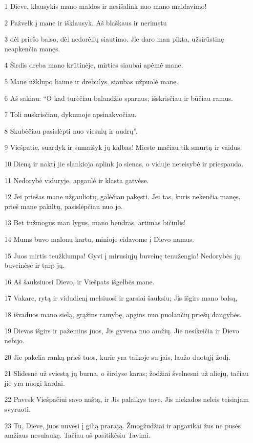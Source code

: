\par 1 Dieve, klausykis mano maldos ir nesišalink nuo mano maldavimo! 
\par 2 Pažvelk į mane ir išklausyk. Aš blaškaus ir nerimstu 
\par 3 dėl priešo balso, dėl nedorėlių siautimo. Jie daro man pikta, užsirūstinę neapkenčia manęs. 
\par 4 Širdis dreba mano krūtinėje, mirties siaubai apėmė mane. 
\par 5 Mane užklupo baimė ir drebulys, siaubas užpuolė mane. 
\par 6 Aš sakiau: “O kad turėčiau balandžio sparnus; išskrisčiau ir būčiau ramus. 
\par 7 Toli nuskrisčiau, dykumoje apsinakvočiau. 
\par 8 Skubėčiau pasislėpti nuo viesulų ir audrų”. 
\par 9 Viešpatie, suardyk ir sumaišyk jų kalbas! Mieste mačiau tik smurtą ir vaidus. 
\par 10 Dieną ir naktį jie slankioja aplink jo sienas, o viduje neteisybė ir priespauda. 
\par 11 Nedorybė viduryje, apgaulė ir klasta gatvėse. 
\par 12 Jei priešas mane užgauliotų, galėčiau pakęsti. Jei tas, kuris nekenčia manęs, prieš mane pakiltų, pasislėpčiau nuo jo. 
\par 13 Bet tu­žmogus man lygus, mano bendras, artimas bičiulis! 
\par 14 Mums buvo malonu kartu, minioje eidavome į Dievo namus. 
\par 15 Juos mirtis teužklumpa! Gyvi į mirusiųjų buveinę tenužengia! Nedorybės jų buveinėse ir tarp jų. 
\par 16 Aš šauksiuosi Dievo, ir Viešpats išgelbės mane. 
\par 17 Vakare, rytą ir vidudienį melsiuosi ir garsiai šauksiu; Jis išgirs mano balsą, 
\par 18 išvaduos mano sielą, grąžins ramybę, apgins nuo puolančių priešų daugybės. 
\par 19 Dievas išgirs ir pažemins juos, Jis gyvena nuo amžių. Jie nesikeičia ir Dievo nebijo. 
\par 20 Jie pakelia ranką prieš tuos, kurie yra taikoje su jais, laužo duotąjį žodį. 
\par 21 Slidesnė už sviestą jų burna, o širdyse karas; žodžiai švelnesni už aliejų, tačiau jie yra nuogi kardai. 
\par 22 Pavesk Viešpačiui savo naštą, ir Jis palaikys tave, Jis niekados neleis teisiajam svyruoti. 
\par 23 Tu, Dieve, juos nuvesi į gilią prarają. Žmogžudžiai ir apgavikai žus nė pusės amžiaus nesulaukę. Tačiau aš pasitikėsiu Tavimi.



